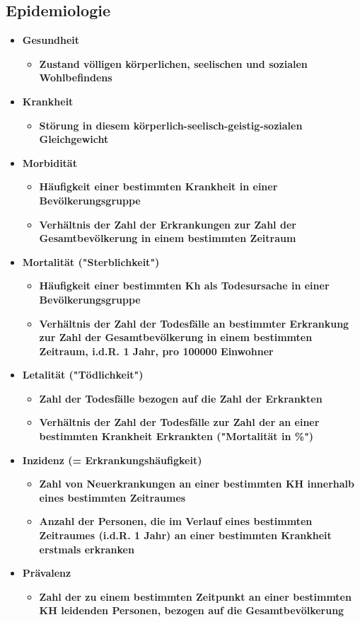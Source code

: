 \subsection{Epidemiologie}
	\begin{itemize}
		\item \textbf{Gesundheit}
			\begin{itemize}
				\item \textbf{Zustand völligen körperlichen, seelischen und sozialen Wohlbefindens}
			\end{itemize}
		\item \textbf{Krankheit}
			\begin{itemize}
				\item \textbf{Störung in diesem körperlich-seelisch-geistig-sozialen Gleichgewicht}
			\end{itemize}
		\item \textbf{Morbidität}
			\begin{itemize}
				\item \textbf{Häufigkeit einer bestimmten Krankheit in einer Bevölkerungsgruppe}
				\item \textbf{Verhältnis der Zahl der Erkrankungen zur Zahl der Gesamtbevölkerung in einem bestimmten Zeitraum}
			\end{itemize}
		\item \textbf{Mortalität ("Sterblichkeit")}
			\begin{itemize}
				\item \textbf{Häufigkeit einer bestimmten Kh als Todesursache in einer Bevölkerungsgruppe}
				\item \textbf{Verhältnis der Zahl der Todesfälle an bestimmter Erkrankung zur Zahl der Gesamtbevölkerung in einem bestimmten Zeitraum, i.d.R. 1 Jahr, pro 100000 Einwohner}
			\end{itemize}
	\pagebreak
		\item \textbf{Letalität ("Tödlichkeit")}
			\begin{itemize}
				\item \textbf{Zahl der Todesfälle bezogen auf die Zahl der Erkrankten}
				\item \textbf{Verhältnis der Zahl der Todesfälle zur Zahl der an einer bestimmten Krankheit Erkrankten ("Mortalität in \%")}
			\end{itemize}
		\item \textbf{Inzidenz (= Erkrankungshäufigkeit)}
			\begin{itemize}
				\item \textbf{Zahl von Neuerkrankungen an einer bestimmten KH innerhalb eines bestimmten Zeitraumes}
				\item \textbf{Anzahl der Personen, die im Verlauf eines bestimmten Zeitraumes (i.d.R. 1 Jahr) an einer bestimmten Krankheit erstmals erkranken}
			\end{itemize}
		\item \textbf{Prävalenz}
			\begin{itemize}
				\item \textbf{Zahl der zu einem bestimmten Zeitpunkt an einer bestimmten KH leidenden Personen, bezogen auf die Gesamtbevölkerung}
			\end{itemize}
	\end{itemize}

